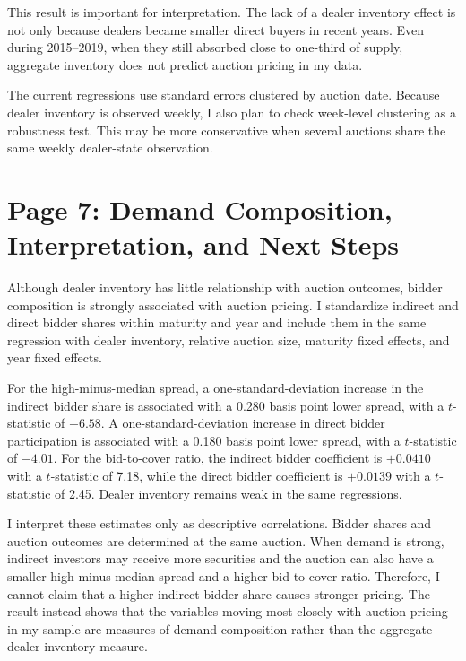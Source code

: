 \documentclass[12pt]{article}
\begin{document}
This result is important for interpretation. The lack of a dealer inventory effect is not only because dealers became smaller direct buyers in recent years. Even during 2015--2019, when they still absorbed close to one-third of supply, aggregate inventory does not predict auction pricing in my data.

The current regressions use standard errors clustered by auction date. Because dealer inventory is observed weekly, I also plan to check week-level clustering as a robustness test. This may be more conservative when several auctions share the same weekly dealer-state observation.

\newpage
\section{Page 7: Demand Composition, Interpretation, and Next Steps}

Although dealer inventory has little relationship with auction outcomes, bidder composition is strongly associated with auction pricing. I standardize indirect and direct bidder shares within maturity and year and include them in the same regression with dealer inventory, relative auction size, maturity fixed effects, and year fixed effects.

For the high-minus-median spread, a one-standard-deviation increase in the indirect bidder share is associated with a 0.280 basis point lower spread, with a $t$-statistic of $-6.58$. A one-standard-deviation increase in direct bidder participation is associated with a 0.180 basis point lower spread, with a $t$-statistic of $-4.01$. For the bid-to-cover ratio, the indirect bidder coefficient is $+0.0410$ with a $t$-statistic of 7.18, while the direct bidder coefficient is $+0.0139$ with a $t$-statistic of 2.45. Dealer inventory remains weak in the same regressions.

I interpret these estimates only as descriptive correlations. Bidder shares and auction outcomes are determined at the same auction. When demand is strong, indirect investors may receive more securities and the auction can also have a smaller high-minus-median spread and a higher bid-to-cover ratio. Therefore, I cannot claim that a higher indirect bidder share causes stronger pricing. The result instead shows that the variables moving most closely with auction pricing in my sample are measures of demand composition rather than the aggregate dealer inventory measure.
\end{document}
